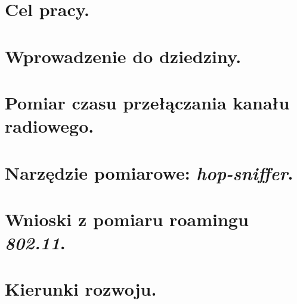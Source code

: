 \documentclass[11pt,a4paper,oneside]{report}
\begin{document}

%
%
%

\tableofcontents

\newpage
\thispagestyle{empty}
\mbox{}


\chapter{Cel pracy.}


\chapter{Wprowadzenie do dziedziny.}


\chapter{Pomiar czasu przełączania kanału radiowego.}


\chapter{Narzędzie pomiarowe: \emph{hop-sniffer}.}


\chapter{Wnioski z pomiaru roamingu \emph{802.11}.}


\chapter{Kierunki rozwoju.}


\nocite{*}

\end{document}
